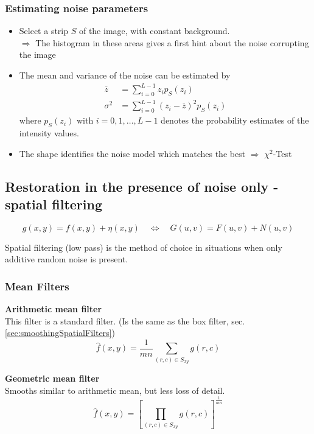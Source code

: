 	\subsubsection{Estimating noise parameters }
		\begin{itemize}
			\item Select a strip $S$ of the image, with constant background. \\
			$\Rightarrow$ The histogram in these areas gives a first hint about the noise corrupting the image
			\item The mean and variance of the noise can be estimated by
				\begin{align}
					\overline{z} &= \sum_{i=0}^{L-1} z_i p_S(z_i) \\
					\sigma^2 &= \sum_{i=0}^{L-1} \left(z_i - \overline{z}\right)^2 p_S(z_i)
				\end{align}
				where $p_S(z_i)$ with $i=0,1,\dots,L-1$ denotes the probability estimates of the intensity values.
			\item The shape identifies the noise model which matches the best $\Rightarrow$ $\chi^2$-Test
		\end{itemize}


\subsection{Restoration in the presence of noise only - spatial filtering }
	\[
		g(x,y) = f(x,y) + \eta(x,y) \quad
		\Leftrightarrow \quad
		G(u,v) = F(u,v) + N(u,v)
	\]
	\begin{center}
		Spatial filtering (low pass) is the method of choice in situations when only additive random noise is present.
	\end{center}

\subsubsection{Mean Filters }
\textbf{Arithmetic mean filter}\\
This filter is a standard filter. (Is the same as the box filter, sec.\ref{sec:smoothingSpatialFilters})
\begin{equation}
	\hat{f}(x,y)= \frac{1}{m  n} \sum\limits_{(r,c)\in S_{xy}}g(r,c)
\end{equation}

\textbf{Geometric mean filter}\\
Smooths similar to arithmetic mean, but less loss of detail.
\begin{equation}
	\hat{f}(x,y)= \left[\prod\limits_{(r,c)\in S_{xy}} g(r,c)\right]^\frac{1}{mn}
\end{equation}

